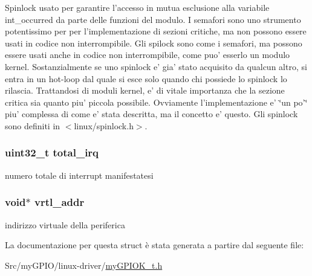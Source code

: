 Spinlock usato per garantire l'accesso in mutua esclusione alla variabile int\+\_\+occurred da parte delle funzioni del modulo. I semafori sono uno strumento potentissimo per per l'implementazione di sezioni critiche, ma non possono essere usati in codice non interrompibile. Gli spilock sono come i semafori, ma possono essere usati anche in codice non interrompibile, come puo' esserlo un modulo kernel. Sostanzialmente se uno spinlock e' gia' stato acquisito da qualcun altro, si entra in un hot-\/loop dal quale si esce solo quando chi possiede lo spinlock lo rilascia. Trattandosi di moduli kernel, e' di vitale importanza che la sezione critica sia quanto piu' piccola possibile. Ovviamente l'implementazione e' \char`\"{}un po'\char`\"{} piu' complessa di come e' stata descritta, ma il concetto e' questo. Gli spinlock sono definiti in $<$linux/spinlock.\+h$>$. \hypertarget{structmy_g_p_i_o_k__t_a2da711ac290a9613b8d8af97f122b997}{
\subsubsection[{total\+\_\+irq}]{\setlength{\rightskip}{0pt plus 5cm}uint32\+\_\+t total\+\_\+irq}}\label{structmy_g_p_i_o_k__t_a2da711ac290a9613b8d8af97f122b997}
numero totale di interrupt manifestatesi \hypertarget{structmy_g_p_i_o_k__t_af5aef493b3c2bc9d1f036ce0acea9bba}{
\subsubsection[{vrtl\+\_\+addr}]{\setlength{\rightskip}{0pt plus 5cm}void$\ast$ vrtl\+\_\+addr}}\label{structmy_g_p_i_o_k__t_af5aef493b3c2bc9d1f036ce0acea9bba}
indirizzo virtuale della periferica 

La documentazione per questa struct è stata generata a partire dal seguente file\+:\begin{DoxyCompactItemize}
\item 
Src/my\+G\+P\+I\+O/linux-\/driver/\hyperlink{my_g_p_i_o_k__t_8h}{my\+G\+P\+I\+O\+K\+\_\+t.\+h}\end{DoxyCompactItemize}
